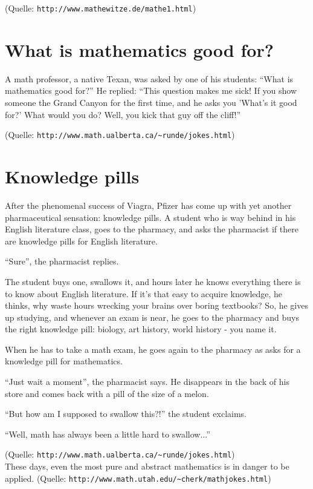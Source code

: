 \documentclass[10pt]{scrbook}
\begin{document}
(Quelle: \verb|http://www.mathewitze.de/mathe1.html|)

\section{What is mathematics good for?}

A math professor, a native Texan, was asked by one of his students: "`What is mathematics good for?"'
He replied: "`This question makes me sick! If you show someone the Grand Canyon for the first time, and he asks you 'What's it good for?' What would you do? Well, you kick that guy off the cliff!"'

(Quelle: \verb|http://www.math.ualberta.ca/~runde/jokes.html|)

\section{Knowledge pills}

After the phenomenal success of Viagra, Pfizer has come up with yet another pharmaceutical sensation: knowledge pills.
A student who is way behind in his English literature class, goes to the pharmacy, and asks the pharmacist if there are knowledge pills for English literature.

"`Sure"', the pharmacist replies.

The student buys one, swallows it, and hours later he knows everything there is to know about English literature. If it's that easy to acquire knowledge, he thinks, why waste hours wrecking your brains over boring textbooks? So, he gives up studying, and whenever an exam is near, he goes to the pharmacy and buys the right knowledge pill: biology, art history, world history - you name it.

When he has to take a math exam, he goes again to the pharmacy as asks for a knowledge pill for mathematics.

"`Just wait a moment"', the pharmacist says. He disappears in the back of his store and comes back with a pill of the size of a melon.

"`But how am I supposed to swallow this?!"' the student exclaims.

"`Well, math has always been a little hard to swallow..."'

(Quelle: \verb|http://www.math.ualberta.ca/~runde/jokes.html|) \\

These days, even the most pure and abstract mathematics is in danger to be applied. (Quelle: \verb|http://www.math.utah.edu/~cherk/mathjokes.html|)
\end{document}
